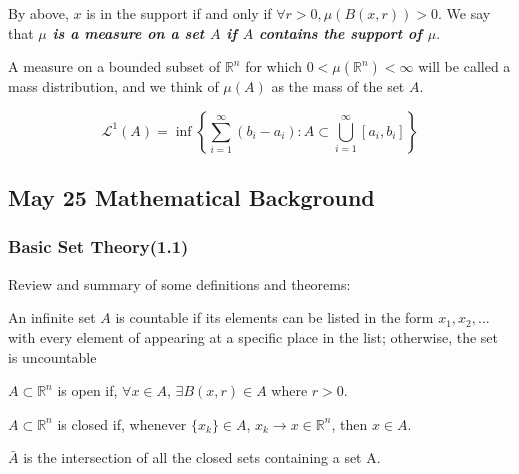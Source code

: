 By above, $x$ is in the support if and only if $\forall r > 0, \mu(B(x, r)) > 0$. We say that \textbf{\textit{$\mu$ is a measure on a set $A$ if $A$ contains the support of $\mu$}}.

\begin{definition}
    A measure on a bounded subset of $\mathbb{R}^{n}$ for which $0<\mu\left(\mathbb{R}^{n}\right)<\infty$ will be called a mass distribution, and we think of $\mu(A)$ as the mass of the set $A$.
\end{definition}

\begin{definition} 
    $$\mathcal{L}^{1}(A)=\inf \left\{\sum_{i=1}^{\infty}\left(b_{i}-a_{i}\right): A \subset \bigcup_{i=1}^{\infty}\left[a_{i}, b_{i}\right]\right\}$$
\end{definition}


\newpage

\subsection{May 25 Mathematical Background}
\subsubsection{Basic Set Theory(1.1)}

Review and summary of some definitions and theorems:

\begin{definition}[Countable]
    An infinite set $A$ is countable if its elements 
    can be listed in the form $x_1, x_2, ...$ with every 
    element of appearing at a specific place in the list; 
    otherwise, the set is uncountable
\end{definition}

\begin{definition}[Open]
    $A \subset \mathbb{R}^n$ is open if, $\forall x\in A$, $\exists B(x, r)\in A$ where $r>0$.
\end{definition}

\begin{definition}[Closed]
    $A \subset \mathbb{R}^n$ is closed if, whenever $\{x_k\}\in A$, $x_k\rightarrow x \in \mathbb{R}^n$, then $x\in A$.
\end{definition}

\begin{definition}[Closure]\label{closure}
    $\bar{A}$ is the intersection of all the closed sets containing a set A. 
\end{definition}

